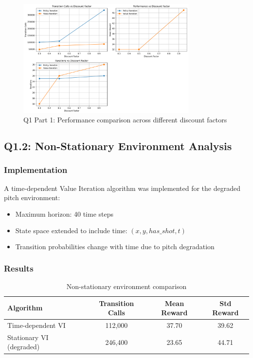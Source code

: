\documentclass[12pt]{article}
\begin{document}
\begin{figure}[H]
\centering
\includegraphics[width=0.8\textwidth]{../Q1/part1/q1_part1_results.png}
\caption{Q1 Part 1: Performance comparison across different discount factors}
\end{figure}

\clearpage
\subsection{Q1.2: Non-Stationary Environment Analysis}

\subsubsection{Implementation}

A time-dependent Value Iteration algorithm was implemented for the degraded pitch environment:
\begin{itemize}
    \item Maximum horizon: 40 time steps
    \item State space extended to include time: $(x, y, has\_shot, t)$
    \item Transition probabilities change with time due to pitch degradation
\end{itemize}

\subsubsection{Results}

\begin{table}[H]
\centering
\caption{Non-stationary environment comparison}
\begin{tabular}{lccc}
\toprule
Algorithm & Transition Calls & Mean Reward & Std Reward \\
\midrule
Time-dependent VI & 112,000 & 37.70 & 39.62 \\
Stationary VI (degraded) & 246,400 & 23.65 & 44.71 \\
\bottomrule
\end{tabular}
\end{table}
\end{document}
